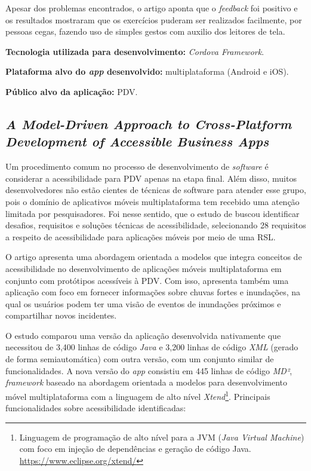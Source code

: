 Apesar dos problemas encontrados, o artigo aponta que o \emph{feedback} foi positivo e os resultados mostraram que os exercícios puderam ser realizados facilmente, por pessoas cegas,
fazendo uso de simples gestos com auxilio dos leitores de tela.

\textbf{Tecnologia utilizada para desenvolvimento:} \emph{Cordova Framework}.

\textbf{Plataforma alvo do \emph{app} desenvolvido:} multiplataforma (Android e iOS).

\textbf{Público alvo da aplicação:} PDV\@.

\subsection{\emph{A Model-Driven Approach to Cross-Platform Development of Accessible Business Apps}}

Um procedimento comum no processo de desenvolvimento de \emph{software} é considerar a acessibilidade para PDV apenas na etapa final.
Além disso, muitos desenvolvedores não estão cientes de técnicas de software para atender esse grupo, pois o domínio de aplicativos
móveis multiplataforma tem recebido uma atenção limitada por pesquisadores. Foi nesse sentido, que o estudo de 
buscou identificar desafios, requisitos e soluções técnicas de acessibilidade, selecionando 28 requisitos a respeito de acessibilidade para
aplicações móveis por meio de uma RSL\@.

O artigo apresenta uma abordagem orientada a modelos que integra conceitos de acessibilidade no desenvolvimento de aplicações móveis multiplataforma em conjunto com protótipos
acessíveis à PDV\@. Com isso, apresenta também uma aplicação com foco em fornecer informações sobre chuvas fortes e inundações, na qual
os usuários podem ter uma visão de eventos de inundações próximos e compartilhar novos incidentes.

O estudo comparou uma versão da aplicação desenvolvida nativamente que necessitou de 3,400 linhas de código \emph{Java} e 3,200 linhas de código \emph{XML}
(gerado de forma semiautomática) com outra versão, com um conjunto similar de funcionalidades. A nova versão do \emph{app} consistiu em 445 linhas de código \emph{MD²}, \emph{framework}
baseado na abordagem orientada a modelos para desenvolvimento móvel multiplataforma com a linguagem de alto nível \emph{Xtend}\footnote{
    Linguagem de programação de alto nível para a JVM (\emph{Java Virtual Machine}) com foco em injeção de dependências e geração de código Java. \url{https://www.eclipse.org/xtend/}}.
Principais funcionalidades sobre acessibilidade identificadas:

